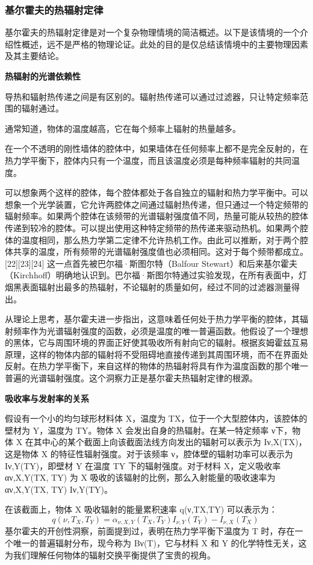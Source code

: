 \subsubsection{基尔霍夫的热辐射定律}
基尔霍夫的热辐射定律是对一个复杂物理情境的简洁概述。以下是该情境的一个介绍性概述，远不是严格的物理论证。此处的目的是仅总结该情境中的主要物理因素及其主要结论。

\textbf{热辐射的光谱依赖性}

导热和辐射热传递之间是有区别的。辐射热传递可以通过过滤器，只让特定频率范围的辐射通过。

通常知道，物体的温度越高，它在每个频率上辐射的热量越多。

在一个不透明的刚性墙体的腔体中，如果墙体在任何频率上都不是完全反射的，在热力学平衡下，腔体内只有一个温度，而且该温度必须是每种频率辐射的共同温度。

可以想象两个这样的腔体，每个腔体都处于各自独立的辐射和热力学平衡中。可以想象一个光学装置，它允许两腔体之间通过辐射热传递，但只通过一个特定频带的辐射频率。如果两个腔体在该频带的光谱辐射强度值不同，热量可能从较热的腔体传递到较冷的腔体。可以提出使用这种特定频带的热传递来驱动热机。如果两个腔体的温度相同，那么热力学第二定律不允许热机工作。由此可以推断，对于两个腔体共享的温度，所有频带的光谱辐射强度值也必须相同。这对于每个频带都成立。[22][23][24] 这一点首先被巴尔福·斯图尔特（Balfour Stewart）和后来基尔霍夫（Kirchhoff）明确地认识到。巴尔福·斯图尔特通过实验发现，在所有表面中，灯烟黑表面辐射出最多的热辐射，不论辐射的质量如何，经过不同的过滤器测量得出。

从理论上思考，基尔霍夫进一步指出，这意味着任何处于热力学平衡的腔体，其辐射频率作为光谱辐射强度的函数，必须是温度的唯一普遍函数。他假设了一个理想的黑体，它与周围环境的界面正好使其吸收所有射向它的辐射。根据亥姆霍兹互易原理，这样的物体内部的辐射将不受阻碍地直接传递到其周围环境，而不在界面处反射。在热力学平衡下，来自这样的物体的热辐射将具有作为温度函数的那个唯一普遍的光谱辐射强度。这个洞察力正是基尔霍夫热辐射定律的根源。

\textbf{吸收率与发射率的关系}

假设有一个小的均匀球形材料体 X，温度为 TX，位于一个大型腔体内，该腔体的壁材为 Y，温度为 TY。物体 X 会发出自身的热辐射。在某一特定频率 ν下，物体 X 在其中心的某个截面上向该截面法线方向发出的辐射可以表示为 Iν,X(TX)，这是物体 X 的特征性辐射强度。对于该频率 ν，腔体壁的辐射功率可以表示为 Iν,Y(TY)，即壁材 Y 在温度 TY 下的辐射强度。对于材料 X，定义吸收率 αν,X,Y(TX, TY) 为 X 吸收的该辐射的比例，那么入射能量的吸收速率为 αν,X,Y(TX, TY) Iν,Y(TY)。

在该截面上，物体 X 吸收辐射的能量累积速率 q(ν,TX,TY) 可以表示为：
\[ q(\nu ,T_{X},T_{Y}) = \alpha_{\nu ,X,Y}(T_{X},T_{Y}) I_{\nu ,Y}(T_{Y}) - I_{\nu ,X}(T_{X})~\]
基尔霍夫的开创性洞察，前面提到过，表明在热力学平衡下温度为 T 时，存在一个唯一的普遍辐射分布，现今称为 Bν(T)，它与材料 X 和 Y 的化学特性无关，这为我们理解任何物体的辐射交换平衡提供了宝贵的视角。

